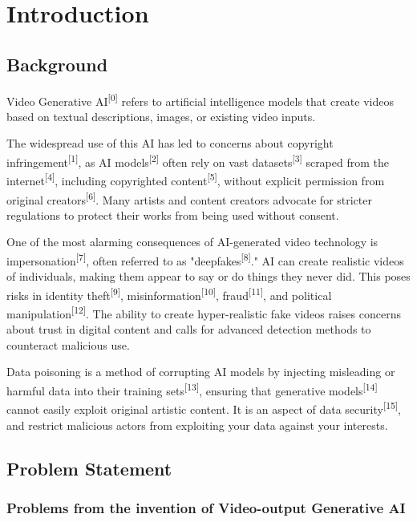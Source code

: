 \chapter{Introduction}
\label{chap:introduction}

\section{Background}
\label{section:background}

Video Generative AI\textsuperscript{[0]} refers to artificial intelligence models that create videos based on textual descriptions, images, or existing video inputs. 

The widespread use of this AI has led to concerns about copyright infringement\textsuperscript{[1]}, as AI models\textsuperscript{[2]} often rely on vast datasets\textsuperscript{[3]} scraped from the internet\textsuperscript{[4]}, including copyrighted content\textsuperscript{[5]}, without explicit permission from original creators\textsuperscript{[6]}. Many artists and content creators advocate for stricter regulations to protect their works from being used without consent.

One of the most alarming consequences of AI-generated video technology is impersonation\textsuperscript{[7]}, often referred to as "deepfakes\textsuperscript{[8]}." AI can create realistic videos of individuals, making them appear to say or do things they never did. This poses risks in identity theft\textsuperscript{[9]}, misinformation\textsuperscript{[10]}, fraud\textsuperscript{[11]}, and political manipulation\textsuperscript{[12]}. The ability to create hyper-realistic fake videos raises concerns about trust in digital content and calls for advanced detection methods to counteract malicious use.

Data poisoning is a method of corrupting AI models by injecting misleading or harmful data into their training sets\textsuperscript{[13]}, ensuring that generative models\textsuperscript{[14]} cannot easily exploit original artistic content. It is an aspect of data security\textsuperscript{[15]}, and restrict malicious actors from exploiting your data against your interests.

\section{Problem Statement}
\label{section:problem-statement}

\subsection{Problems from the invention of Video-output Generative AI}
\label{subsection:Problems-From-Video-AI}

